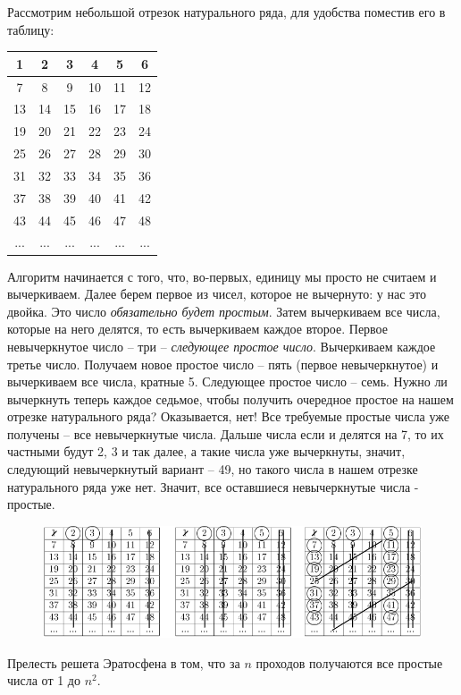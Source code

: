 \documentclass[russian]{lecture-notes}
\begin{document}
	\begin{example*} [Решето Эратосфена]
		
		Рассмотрим небольшой отрезок натурального ряда, для удобства поместив его в таблицу:\\
		
		\begin{center}
			\begin{tabular}{|c|c|c|c|c|c|}
				\hline
				1 & 2 & 3 & 4 & 5 & 6\\\hline
				7 & 8 & 9 & 10 & 11 & 12\\\hline
				13 & 14 & 15 & 16 & 17 & 18\\\hline
				19 & 20 & 21 & 22 & 23 & 24\\\hline 
				25 & 26 & 27 & 28 & 29 & 30\\\hline 
				31 & 32 & 33 & 34 & 35 & 36\\\hline 
				37 & 38 & 39 & 40 & 41 & 42\\\hline 
				43 & 44 & 45 & 46 & 47 & 48\\\hline
				... & ... & ... & ... & ... & ...\\\hline
			\end{tabular}
		\end{center}
		
		Алгоритм начинается с того, что, во-первых, единицу мы просто не считаем и вычеркиваем. Далее берем первое из чисел, которое не вычернуто: у нас это двойка. Это число \textit{обязательно будет простым}. Затем вычеркиваем все числа, которые на него делятся, то есть вычеркиваем каждое второе. Первое невычеркнутое число -- три -- \textit{следующее простое число}. Вычеркиваем каждое третье число. Получаем новое простое число -- пять  (первое невычеркнутое) и вычеркиваем все числа, кратные 5. Следующее простое число -- семь. Нужно ли вычеркнуть теперь каждое седьмое, чтобы получить очередное простое на нашем отрезке натурального ряда? Оказывается, нет! Все требуемые простые числа уже получены -- все невычеркнутые числа. Дальше числа если и делятся на 7, то их частными будут 2, 3 и так далее, а такие числа уже вычеркнуты, значит, следующий невычеркнутый вариант -- 49, но такого числа в нашем отрезке натурального ряда уже нет. Значит, все оставшиеся невычеркнутые числа - простые. 
		\newline
		\begin{figure}[h]
			\centering
			\includegraphics[width=1\textwidth]{resheto}
		\end{figure}
		
		Прелесть решета Эратосфена в том, что за $n$ проходов получаются все простые числа от 1 до $n^{2}$.
		
	\end{example*}
		
\end{document}
